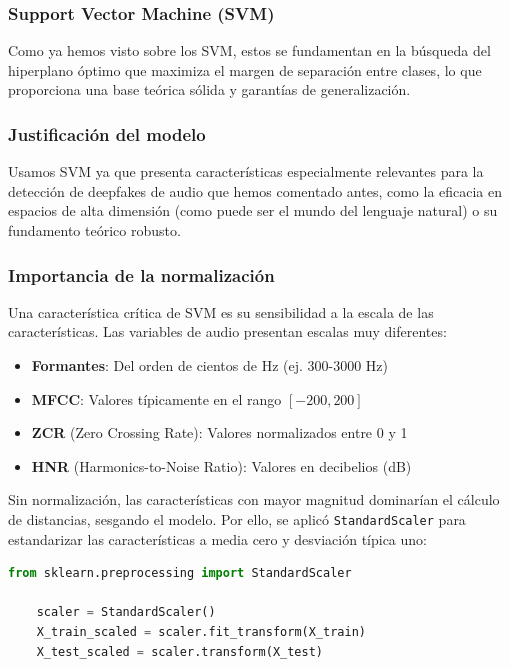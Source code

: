 \subsubsection{Support Vector Machine (SVM)}

Como ya hemos visto sobre los SVM, estos se fundamentan en la búsqueda del hiperplano óptimo que maximiza el margen de separación entre clases, lo que proporciona una base teórica sólida y garantías de generalización.

\subsubsection*{Justificación del modelo}

Usamos SVM ya que presenta características especialmente relevantes para la detección de deepfakes de audio que hemos comentado antes, como la eficacia en espacios de alta dimensión (como puede ser el mundo del lenguaje natural) o su fundamento teórico robusto. 

\subsubsection*{Importancia de la normalización}

Una característica crítica de SVM es su sensibilidad a la escala de las características. Las variables de audio presentan escalas muy diferentes:

\begin{itemize}
    \item \textbf{Formantes}: Del orden de cientos de Hz (ej. 300-3000 Hz)
    \item \textbf{MFCC}: Valores típicamente en el rango \([-200, 200]\)
    \item \textbf{ZCR} (Zero Crossing Rate): Valores normalizados entre 0 y 1
    \item \textbf{HNR} (Harmonics-to-Noise Ratio): Valores en decibelios (dB)
\end{itemize}

Sin normalización, las características con mayor magnitud dominarían el cálculo de distancias, sesgando el modelo. Por ello, se aplicó \texttt{StandardScaler} para estandarizar las características a media cero y desviación típica uno:

\begin{lstlisting}[language=Python, caption=Normalización de características para SVM]
	from sklearn.preprocessing import StandardScaler

	scaler = StandardScaler()
	X_train_scaled = scaler.fit_transform(X_train)
	X_test_scaled = scaler.transform(X_test)
\end{lstlisting}

